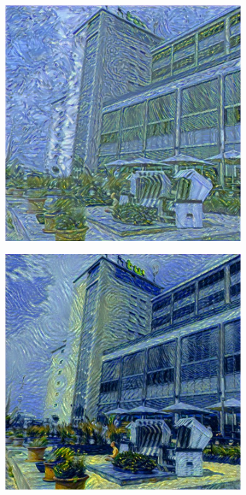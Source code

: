 \begin{figure}[H]
    \centering
    \begin{subfigure}[h]{0.3\textwidth}
        \centering
        \includegraphics[width=\textwidth]{resources/content/output/neural-style/htw-test-1-4.jpg}
    \end{subfigure}
    \begin{subfigure}[h]{0.3\textwidth}
        \centering
        \includegraphics[width=\textwidth]{resources/content/output/neural-style/htw-test-1-5.jpg}

\end{subfigure}
\end{figure}
